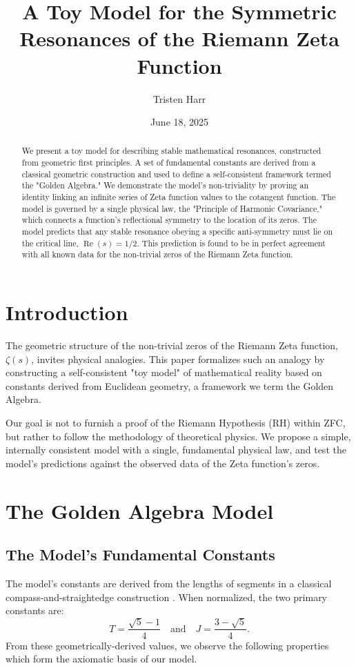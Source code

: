 \documentclass{amsart}
\title[A Toy Model for Zeta Resonances]{A Toy Model for the Symmetric Resonances of the Riemann Zeta Function}
\author{Tristen Harr}
\date{June 18, 2025}
\theoremstyle{plain}
\theoremstyle{definition}
\theoremstyle{remark}
\DeclareMathOperator{\re}{Re}
\begin{document}
\maketitle

\begin{abstract}
We present a toy model for describing stable mathematical resonances, constructed from geometric first principles. A set of fundamental constants are derived from a classical geometric construction and used to define a self-consistent framework termed the "Golden Algebra." We demonstrate the model's non-triviality by proving an identity linking an infinite series of Zeta function values to the cotangent function. The model is governed by a single physical law, the "Principle of Harmonic Covariance," which connects a function's reflectional symmetry to the location of its zeros. The model predicts that any stable resonance obeying a specific anti-symmetry must lie on the critical line, $\re(s)=1/2$. This prediction is found to be in perfect agreement with all known data for the non-trivial zeros of the Riemann Zeta function.
\end{abstract}

\section{Introduction}
The geometric structure of the non-trivial zeros of the Riemann Zeta function, $\zeta(s)$, invites physical analogies. This paper formalizes such an analogy by constructing a self-consistent "toy model" of mathematical reality based on constants derived from Euclidean geometry, a framework we term the Golden Algebra.

Our goal is not to furnish a proof of the Riemann Hypothesis (RH) within ZFC, but rather to follow the methodology of theoretical physics. We propose a simple, internally consistent model with a single, fundamental physical law, and test the model's predictions against the observed data of the Zeta function's zeros.

\section{The Golden Algebra Model}
\subsection{The Model's Fundamental Constants}
The model's constants are derived from the lengths of segments in a classical compass-and-straightedge construction \cite{HarrManuscripts}. When normalized, the two primary constants are:
\[ T = \frac{\sqrt{5}-1}{4} \quad \text{and} \quad J = \frac{3-\sqrt{5}}{4}. \]
From these geometrically-derived values, we observe the following properties which form the axiomatic basis of our model.
\end{document}
